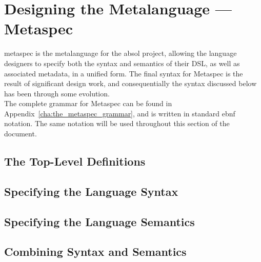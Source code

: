 \section{Designing the Metalanguage --- Metaspec} %
\label{sec:designing_the_metalanguage_metaspec}

\gls{metaspec} is the metalanguage for the \gls{absol} project, allowing the language designers to specify both the syntax and semantics of their DSL, as well as associated metadata, in a unified form. 
The final syntax for Metaspec is the result of significant design work, and consequentially the syntax discussed below has been through some evolution. \\

The complete grammar for Metaspec can be found in Appendix~\ref{cha:the_metaspec_grammar}, and is written in standard \gls{ebnf} notation. 
The same notation will be used throughout this section of the document. 

\subsection{The Top-Level Definitions} %
\label{sub:the_top_level_definitions}


\subsection{Specifying the Language Syntax} %
\label{sub:specifying_the_language_syntax}


\subsection{Specifying the Language Semantics} %
\label{sub:specifying_the_language_semantics}


\subsection{Combining Syntax and Semantics} %
\label{sub:combining_syntax_and_semantics}

